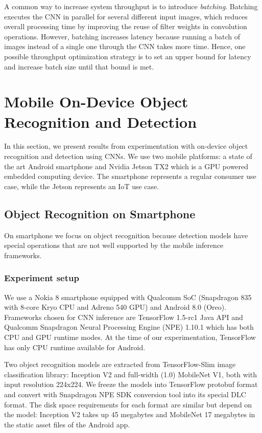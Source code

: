 \documentclass[sigconf]{acmart}
\begin{document}
A common way to increase system throughput is to introduce \textit{batching}. Batching executes the CNN in parallel for several different input images, which reduces overall processing time by improving the reuse of filter weights in convolution operations. However, batching increases latency because running a batch of images instead of a single one through the CNN takes more time. Hence, one possible throughput optimization strategy is to set an upper bound for latency and increase batch size until that bound is met. 



\section{Mobile On-Device Object Recognition and Detection}\label{sec:mobile}

In this section, we present results from experimentation with on-device object recognition and detection using CNNs. We use two mobile platforms: a state of the art Android smartphone and Nvidia Jetson TX2 which is a GPU powered embedded computing device. The smartphone represents a regular consumer use case, while the Jetson represents an IoT use case.

\subsection{Object Recognition on Smartphone}\label{sec:android_recognition}
On smartphone we focus on object recognition because detection models have special operations that are not well supported by the mobile inference frameworks.

\subsubsection{Experiment setup}

We use a Nokia 8 smartphone equipped with Qualcomm SoC (Snapdragon 835 with 8-core Kryo CPU and Adreno 540 GPU) and Android 8.0 (Oreo). Frameworks chosen for CNN inference are TensorFlow 1.5-rc1 Java API and Qualcomm Snapdragon Neural Processing Engine (NPE) 1.10.1 which has both CPU and GPU runtime modes. At the time of our experimentation, TensorFlow has only CPU runtime available for Android.

Two object recognition models are extracted from TensorFlow-Slim image classification library: Inception V2 and full-width (1.0) MobileNet V1, both with input resolution 224x224. We freeze the models into TensorFlow protobuf format and convert with Snapdragon NPE SDK conversion tool into its special DLC format. The disk space requirements for each format are similar but depend on the model: Inception V2 takes up 45 megabytes and MobileNet 17 megabytes in the static asset files of the Android app.
\end{document}
